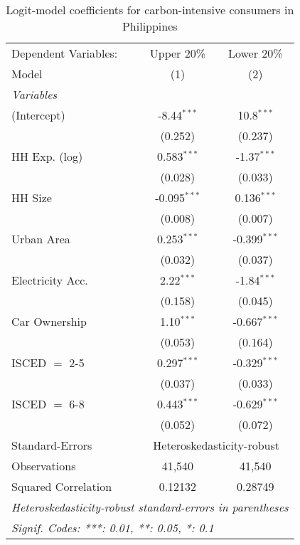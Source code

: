 
\begin{table}[htbp!]
   \centering
   \small
   \begin{adjustbox}{width = 1\textwidth, max height = 0.95\textheight, center}
      \begin{threeparttable}[b]
         \caption{\label{tab:Logit_1_PHL} Logit-model coefficients for carbon-intensive consumers in Philippines}
         \begin{tabular}{lcc}
            \tabularnewline \midrule \midrule
            Dependent Variables: & Upper 20\%     & Lower 20\%\\   
            Model                & (1)            & (2)\\  
            \midrule
            \emph{Variables}\\
            (Intercept)          & -8.44$^{***}$  & 10.8$^{***}$\\   
                                 & (0.252)        & (0.237)\\   
            HH Exp. (log)        & 0.583$^{***}$  & -1.37$^{***}$\\   
                                 & (0.028)        & (0.033)\\   
            HH Size              & -0.095$^{***}$ & 0.136$^{***}$\\   
                                 & (0.008)        & (0.007)\\   
            Urban Area           & 0.253$^{***}$  & -0.399$^{***}$\\   
                                 & (0.032)        & (0.037)\\   
            Electricity Acc.     & 2.22$^{***}$   & -1.84$^{***}$\\   
                                 & (0.158)        & (0.045)\\   
            Car Ownership        & 1.10$^{***}$   & -0.667$^{***}$\\   
                                 & (0.053)        & (0.164)\\   
            ISCED $=$ 2-5        & 0.297$^{***}$  & -0.329$^{***}$\\   
                                 & (0.037)        & (0.033)\\   
            ISCED $=$ 6-8        & 0.443$^{***}$  & -0.629$^{***}$\\   
                                 & (0.052)        & (0.072)\\   
            \midrule 
            Standard-Errors & \multicolumn{2}{c}{Heteroskedasticity-robust} \\ 
            Observations         & 41,540         & 41,540\\  
            Squared Correlation  & 0.12132        & 0.28749\\  
            \midrule \midrule
            \multicolumn{3}{l}{\emph{Heteroskedasticity-robust standard-errors in parentheses}}\\
            \multicolumn{3}{l}{\emph{Signif. Codes: ***: 0.01, **: 0.05, *: 0.1}}\\
         \end{tabular}
         

\end{threeparttable}
\end{adjustbox}
\end{table}
